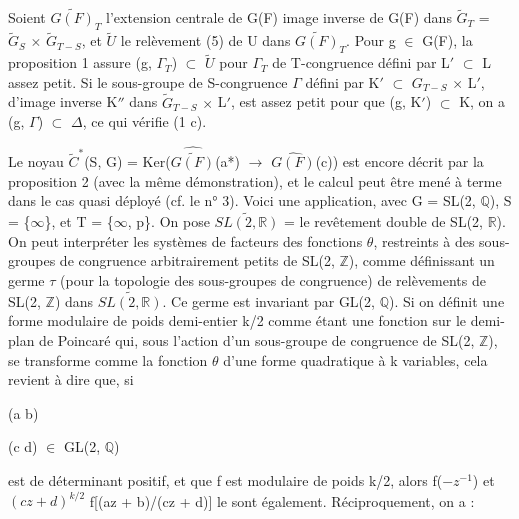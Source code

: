 \documentclass[10pt,a4paper]{article}
\begin{document}
\smallskip
\noindent Soient \ensuremath{\widetilde{G(F)}_T} l'extension centrale de G(F) image inverse de G(F) dans \ensuremath{\widetilde{G}_T} = \ensuremath{\widetilde{G}_S} \ensuremath{×} \ensuremath{\widetilde{G}_{T−S}}, et \ensuremath{\widetilde{U}} le relèvement (5) de U dans \ensuremath{\widetilde{G(F)}_T}. Pour g \ensuremath{∈} G(F), la proposition 1 assure (g, \ensuremath{Γ_T}) \ensuremath{⊂} \ensuremath{\widetilde{U}} pour \ensuremath{Γ_T} de T-congruence défini par L\ensuremath{′} \ensuremath{⊂} L assez petit. Si le sous-groupe de S-congruence \ensuremath{Γ} défini par K\ensuremath{′} \ensuremath{⊂} \ensuremath{G_{T−S}} \ensuremath{×} L\ensuremath{′}, d'image inverse K\ensuremath{″} dans \ensuremath{\widetilde{G}_{T−S}} \ensuremath{×} L\ensuremath{′}, est assez petit pour que (g, K\ensuremath{′}) \ensuremath{⊂} K, on a (g, \ensuremath{Γ}) \ensuremath{⊂} \ensuremath{Δ}, ce qui vérifie (1 c).\par
\smallskip
\noindent Le noyau \ensuremath{\widetilde{C}^{*}}(S, G) = Ker(\ensuremath{\widehat{\widetilde{G(F)}}}(a*) \ensuremath{→} \ensuremath{\widehat{G(F)}}(c)) est encore décrit par la proposition 2 (avec la même démonstration), et le calcul peut être mené à terme dans le cas quasi déployé (cf. le n° 3). Voici une application, avec G = SL(2, \ensuremath{ℚ}), S = \{\ensuremath{∞}\}, et T = \{\ensuremath{∞}, p\}. On pose \ensuremath{\widetilde{SL(2, ℝ)}} = le revêtement double de SL(2, \ensuremath{ℝ}). On peut interpréter les systèmes de facteurs des fonctions \ensuremath{θ}, restreints à des sous-groupes de congruence arbitrairement petits de SL(2, \ensuremath{ℤ}), comme définissant un germe \ensuremath{τ} (pour la topologie des sous-groupes de congruence) de relèvements de SL(2, \ensuremath{ℤ}) dans \ensuremath{\widetilde{SL(2, ℝ)}}. Ce germe est invariant par GL(2, \ensuremath{ℚ}). Si on définit une forme modulaire de poids demi-entier k/2 comme étant une fonction sur le demi-plan de Poincaré qui, sous l'action d'un sous-groupe de congruence de SL(2, \ensuremath{ℤ}), se transforme comme la fonction \ensuremath{θ} d'une forme quadratique à k variables, cela revient à dire que, si\par
\smallskip
\noindent (a  b)\par
\noindent (c  d) \ensuremath{∈} GL(2, \ensuremath{ℚ})\par
\smallskip
\noindent est de déterminant positif, et que f est modulaire de poids k/2, alors f(\ensuremath{−}\ensuremath{z^{-1}}) et \ensuremath{(cz + d)^{k/2}} f[(az + b)/(cz + d)] le sont également. Réciproquement, on a :\par
\end{document}
